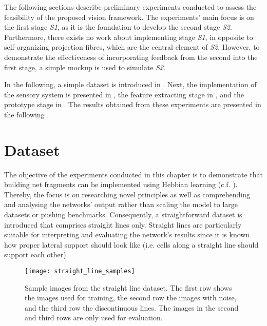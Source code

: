 The following sections describe preliminary experiments conducted to assess the feasibility of the proposed vision framework.
The experiments' main focus is on the first stage \emph{S1}, as it is the foundation to develop the second stage \emph{S2}. Furthermore, there exists no work about implementing stage \emph{S1}, in opposite to self-organizing projection fibres, which are the central element of \emph{S2}.
However, to demonstrate the effectiveness of incorporating feedback from the second into the first stage, a simple mockup is used to simulate \emph{S2}.

In the following, a simple dataset is introduced in . Next, the implementation of the sensory system is presented in , the feature extracting stage in , and the prototype stage in . The results obtained from these experiments are presented in the following .


\section{Dataset}
The objective of the experiments conducted in this chapter is to demonstrate that building net fragments can be implemented using Hebbian learning  (c.f. ).
Thereby, the focus is on researching novel principles as well as comprehending and analysing the networks' output rather than scaling the model to large datasets or pushing benchmarks.
Consequently, a straightforward dataset is introduced that comprises straight lines only.
Straight lines are particularly suitable for interpreting and evaluating the network's results since it is known how proper lateral support should look like (i.e. cells along a straight line should support each other).


\begin{figure}[h]
    \centering
    \texttt{[image: straight\_line\_samples]}
    \caption[Sample images from the dataset]{Sample images from the straight line dataset. The first row shows the images used for training, the second row the images with noise, and the third row the discontinuous lines. The images in the second and third rows are only used for evaluation.}
\end{figure}


